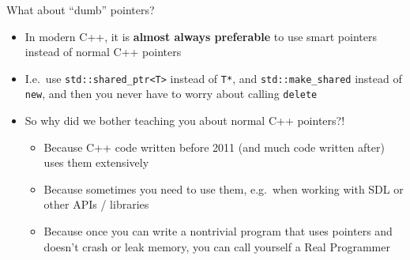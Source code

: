 \begin{frame}[fragile]{What about ``dumb'' pointers?}
    \begin{itemize}
        \item In modern C++, it is \textbf{almost always preferable} to use smart pointers
            instead of normal C++ pointers \pause
        \item I.e.\ use \lstinline{std::shared_ptr<T>} instead of \lstinline{T*},
            and \lstinline{std::make_shared} instead of \lstinline{new},
            and then you never have to worry about calling \lstinline{delete} \pause
        \item So why did we bother teaching you about normal C++ pointers?! \pause
            \begin{itemize}
                \item Because C++ code written before 2011 (and much code written after)
                    uses them extensively \pause
                \item Because sometimes you need to use them,
                    e.g.\ when working with SDL or other APIs / libraries \pause
                \item Because once you can write a nontrivial program that uses pointers and doesn't
                    crash or leak memory, you can call yourself a Real Programmer \smiley
            \end{itemize}
    \end{itemize}
\end{frame}

